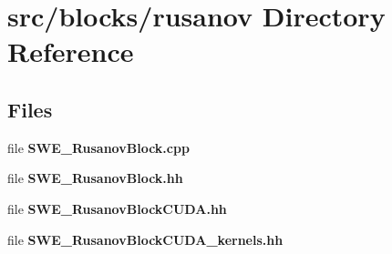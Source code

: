 \section{src/blocks/rusanov Directory Reference}
\label{dir_e2f9752dba4705e64e488c38c9b703fc}
\subsection*{Files}
\begin{DoxyCompactItemize}
\item 
file {\bf S\-W\-E\-\_\-\-Rusanov\-Block.\-cpp}
\item 
file {\bf S\-W\-E\-\_\-\-Rusanov\-Block.\-hh}
\item 
file {\bf S\-W\-E\-\_\-\-Rusanov\-Block\-C\-U\-D\-A.\-hh}
\item 
file {\bf S\-W\-E\-\_\-\-Rusanov\-Block\-C\-U\-D\-A\-\_\-kernels.\-hh}
\end{DoxyCompactItemize}
